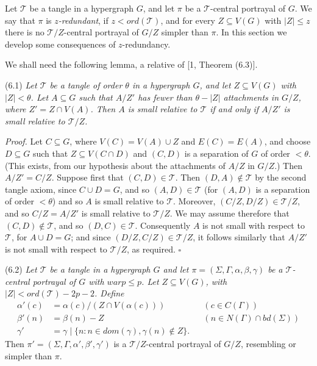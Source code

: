 Let $\mathscr{T}$ be a tangle in a hypergraph $G$, and let $\pi$ be a $\mathscr{T}$-central portrayal of $G$. We say that $\pi$ is \textit{$z$-redundant}, if $z < ord(\mathscr{T})$, and for every $Z \subseteq V(G)$ with $|Z| \le z$ there is no $\mathscr{T}/Z$-central portrayal of $G/Z$ simpler than $\pi$. In this section we develop some consequences of $z$-redundancy.

We shall need the following lemma, a relative of [1, Theorem (6.3)].

\stmt
(6.1) \textit{Let $\mathscr{T}$ be a tangle of order $\theta$ in a hypergraph $G$, and let $Z \subseteq V(G)$ with $|Z| < \theta$. Let $A \subseteq G$ such that $A/Z'$ has fewer than $\theta - |Z|$ attachments in $G/Z$, where $Z' = Z \cap V(A)$. Then $A$ is small relative to $\mathscr{T}$ if and only if $A/Z'$ is small relative to $\mathscr{T}/Z$.}

\textit{Proof.} Let $C \subseteq G$, where $V(C) = V(A) \cup Z$ and $E(C) = E(A)$, and choose $D \subseteq G$ such that $Z \subseteq V(C \cap D)$ and $(C, D)$ is a separation of $G$ of order $< \theta$. (This exists, from our hypothesis about the attachments of $A/Z$ in $G/Z$.) Then $A/Z' = C/Z$. Suppose first that $(C, D) \in \mathscr{T}$. Then $(D, A) \notin \mathscr{T}$ by the second tangle axiom, since $C \cup D = G$, and so $(A, D) \in \mathscr{T}$ (for $(A, D)$ is a separation of order $< \theta$) and so $A$ is small relative to $\mathscr{T}$. Moreover, $(C/Z, D/Z) \in \mathscr{T}/Z$, and so $C/Z = A/Z'$ is small relative to $\mathscr{T}/Z$. We may assume therefore that $(C, D) \notin \mathscr{T}$, and so $(D, C) \in \mathscr{T}$. Consequently $A$ is not small with respect to $\mathscr{T}$, for $A \cup D = G$; and since $(D/Z, C/Z) \in \mathscr{T}/Z$, it follows similarly that $A/Z'$ is not small with respect to $\mathscr{T}/Z$, as required. $\square$

\stmt
(6.2) \textit{Let $\mathscr{T}$ be a tangle in a hypergraph $G$ and let $\pi = (\Sigma, \Gamma, \alpha, \beta, \gamma)$ be a $\mathscr{T}$-central portrayal of $G$ with $warp \le p$. Let $Z \subseteq V(G)$, with $|Z| < ord(\mathscr{T}) - 2p - 2$. Define}
\begin{align*}
\alpha'(c) &= \alpha(c)/(Z \cap V(\alpha(c))) && (c \in C(\Gamma)) \\
\beta'(n) &= \beta(n) - Z && (n \in N(\Gamma) \cap bd(\Sigma)) \\
\gamma' &= \gamma \mid \{n : n \in dom(\gamma), \gamma(n) \notin Z\}.
\end{align*}
Then $\pi' = (\Sigma, \Gamma, \alpha', \beta', \gamma')$ is a $\mathscr{T}/Z$-central portrayal of $G/Z$, resembling or simpler than $\pi$.

